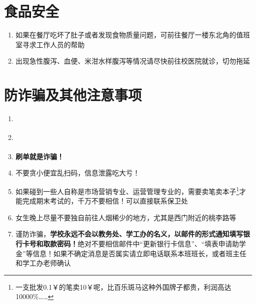 \section[食品安全]{食品安全}
\begin{enumerate}
    \item 如果在餐厅吃坏了肚子或者发现食物质量问题，可前往餐厅一楼东北角的值班室寻求工作人员的帮助
    \item 出现急性腹泻、血便、米泔水样腹泻等情况请尽快前往校医院就诊，切勿拖延
\end{enumerate}

\section[防诈骗及其他注意事项]{防诈骗及其他注意事项}
\begin{enumerate}
    \item \textbf{}
    \item \textbf{}
    \item \textbf{刷单就是诈骗！}
    \item 不要贪小便宜乱扫码，信息泄露吃大亏！
    \item 如果碰到一些人自称是市场营销专业、运营管理专业的，需要卖笔卖本子\footnote{一支批发0.1￥的笔卖10￥呢，比百乐斑马这种外国牌子都贵，利润高达10000\%……}才能完成期末考试的，千万不要相信！可以直接联系保卫处
    \item 女生晚上尽量不要独自前往人烟稀少的地方，尤其是西门附近的桃李路等
    \item 谨防诈骗，\textbf{学校永远不会以教务处、学工办的名义，以邮件的形式通知填写银行卡号和取款密码！}绝对不要相信邮件中“更新银行卡信息”、“填表申请助学金”等信息！如果不确定消息是否属实请立即电话联系本班班长，或者班主任和学工办老师确认
\end{enumerate}
